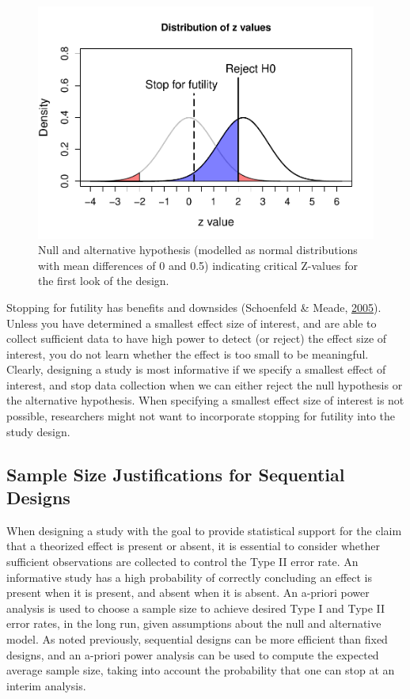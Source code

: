 \documentclass[
  english,
  ,jou, a4paper,floatsintext]{apa6}
\begin{document}
\begin{figure}
\centering
\includegraphics{sequential_tutorial_files/figure-latex/futility3-1.pdf}
\caption{\label{fig:futility3}Null and alternative hypothesis (modelled as normal distributions with mean differences of 0 and 0.5) indicating critical Z-values for the first look of the design.}
\end{figure}

Stopping for futility has benefits and downsides (Schoenfeld \& Meade, \protect\hyperlink{ref-schoenfeld_procon_2005}{2005}). Unless you have determined a smallest effect size of interest, and are able to collect sufficient data to have high power to detect (or reject) the effect size of interest, you do not learn whether the effect is too small to be meaningful. Clearly, designing a study is most informative if we specify a smallest effect of interest, and stop data collection when we can either reject the null hypothesis or the alternative hypothesis. When specifying a smallest effect size of interest is not possible, researchers might not want to incorporate stopping for futility into the study design.

\hypertarget{sample-size-justifications-for-sequential-designs}{%
\subsection{Sample Size Justifications for Sequential Designs}\label{sample-size-justifications-for-sequential-designs}}

When designing a study with the goal to provide statistical support for the claim that a theorized effect is present or absent, it is essential to consider whether sufficient observations are collected to control the Type II error rate. An informative study has a high probability of correctly concluding an effect is present when it is present, and absent when it is absent. An a-priori power analysis is used to choose a sample size to achieve desired Type I and Type II error rates, in the long run, given assumptions about the null and alternative model. As noted previously, sequential designs can be more efficient than fixed designs, and an a-priori power analysis can be used to compute the expected average sample size, taking into account the probability that one can stop at an interim analysis.
\end{document}
